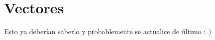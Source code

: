 \documentclass[/home/hernan/Documentos/Apuntes_mecanica_teorica/main.tex]{subfiles}
\begin{document}
    \section{Vectores}\label{sec:vectores}


    Esto ya deberían saberlo y probablemente se actualice de último $: \left . \right)$

    \newpage
\end{document}
